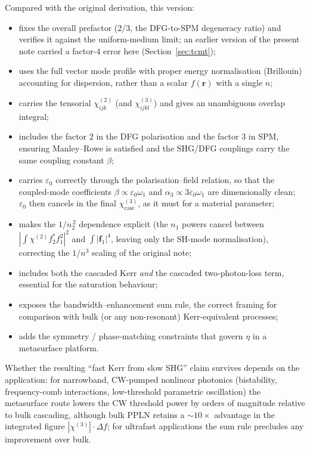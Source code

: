 \documentclass[11pt,a4paper]{article}
\newcommand{\eps}{\varepsilon}
\newcommand{\bvec}[1]{\mathbf{#1}}
\newcommand{\f}{\bvec{f}}
\newcommand{\ri}{\bvec{r}}
\newcommand{\chitwo}{\chi^{(2)}}
\newcommand{\chithree}{\chi^{(3)}}
\begin{document}
Compared with the original derivation, this version:
\begin{itemize}
  \item fixes the overall prefactor ($2/3$, the DFG-to-SPM degeneracy
        ratio) and verifies it against the uniform-medium limit; an
        earlier version of the present note carried a factor-$4$ error
        here (Section~\ref{sec:tcmt});
  \item uses the full vector mode profile with proper energy
        normalisation (Brillouin) accounting for dispersion, rather
        than a scalar $f(\ri)$ with a single $n$;
  \item carries the tensorial $\chitwo_{ijk}$ (and $\chithree_{ijkl}$)
        and gives an unambiguous overlap integral;
  \item includes the factor $2$ in the DFG polarisation and the factor
        $3$ in SPM, ensuring Manley--Rowe is satisfied and the SHG/DFG
        couplings carry the same coupling constant $\beta$;
  \item carries $\eps_0$ correctly through the polarisation--field
        relation, so that the coupled-mode coefficients
        $\beta\propto\eps_0\omega_1$ and $\alpha_3\propto 3\eps_0\omega_1$
        are dimensionally clean; $\eps_0$ then cancels in the final
        $\chithree_\text{casc}$, as it must for a material parameter;
  \item makes the $1/n_2^{\,2}$ dependence explicit (the $n_1$ powers
        cancel between $|\!\int\!\chitwo f_2^*f_1^2|^2$ and $\int|\f_1|^4$,
        leaving only the SH-mode normalisation), correcting the
        $1/n^3$ scaling of the original note;
  \item includes both the cascaded Kerr \emph{and} the cascaded
        two-photon-loss term, essential for the saturation behaviour;
  \item exposes the bandwidth--enhancement sum rule, the correct
        framing for comparison with bulk (or any non-resonant)
        Kerr-equivalent processes;
  \item adds the symmetry / phase-matching constraints that govern
        $\eta$ in a metasurface platform.
\end{itemize}

Whether the resulting ``fast Kerr from slow SHG'' claim survives depends
on the application: for narrowband, CW-pumped nonlinear photonics
(bistability, frequency-comb interactions, low-threshold parametric
oscillation) the metasurface route lowers the CW threshold power by
orders of magnitude relative to bulk cascading, although bulk PPLN
retains a $\sim\!10\times$ advantage in the integrated figure
$|\chithree|\cdot\Delta f$; for ultrafast applications the sum rule
precludes any improvement over bulk.
\end{document}
